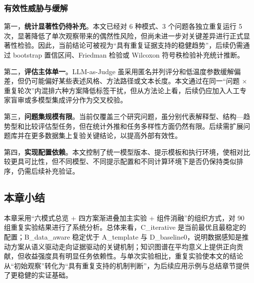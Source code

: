 \subsubsection{有效性威胁与缓解}

第一，\textbf{统计显著性仍待补充}。本文已经对 6 种模式、3 个问题各独立重复运行 5 次，显著降低了单次观察带来的偶然性风险，但尚未进一步对关键差异进行正式显著性检验。因此，当前结论可被视为“具有重复证据支持的稳健趋势”，后续仍需通过 bootstrap 置信区间、Friedman 检验或 Wilcoxon 符号秩检验补充统计推断。

第二，\textbf{评估主体单一}。LLM-as-Judge 虽采用匿名并列评分和低温度参数缓解偏差，但仍可能偏好某些表述风格、方法路径或文本长度。本文通过在同一“问题 × 重复轮次”内混排六种方案降低标签干扰，但从方法论上看，后续仍应加入人工专家盲审或多模型集成评分作为交叉校验。

第三，\textbf{问题集规模有限}。当前仅覆盖三个研究问题，虽分别代表解释型、结构—趋势型和比较评估型任务，但在统计外推和任务多样性方面仍然有限。后续需扩展问题库并在更多数据集上复验关键结论，以提高外部有效性。

第四，\textbf{实现配置依赖}。本文控制了统一模型版本、提示模板和执行环境，使相对比较更具可比性，但不同模型、不同提示配置和不同计算环境下是否仍保持类似排序，仍需后续补充验证。

\subsection{本章小结}

本章采用“六模式总览 + 四方案渐进叠加主实验 + 组件消融”的组织方式，对 90 组重复实验结果进行了系统分析。总体来看，C\_iterative 是当前最优且最稳定的配置；B\_data\_aware 稳定优于 A\_template 与 D\_baseline0，说明数据感知是推动方案从语义驱动走向证据驱动的关键机制；知识图谱在平均意义上提供正向贡献，但收益强度具有明显任务依赖性。与单次实验相比，重复实验使本文的结论从“初始观察”转化为“具有重复支持的机制判断”，为后续应用示例与总结章节提供了更稳健的实证基础。
